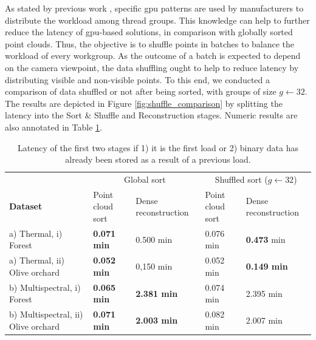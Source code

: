 As stated by previous work \cite{schutz_rendering_2021, kerbl_effective_2017}, specific \acrshort{gpu} patterns are used by manufacturers to distribute the workload among thread groups. This knowledge can help to further reduce the latency of \acrshort{gpu}-based solutions, in comparison with globally sorted point clouds. Thus, the objective is to shuffle points in batches to balance the workload of every workgroup. As the outcome of a batch is expected to depend on the camera viewpoint, the data shuffling ought to help to reduce latency by distributing visible and non-visible points. To this end, we conducted a comparison of data shuffled or not after being sorted, with groups of size $g \gets 32$. The results are depicted in Figure \ref{fig:shuffle_comparison} by splitting the latency into the Sort \& Shuffle and Reconstruction stages. Numeric results are also annotated in Table \ref{table:shuffling_results}.

\renewcommand{\arraystretch}{1.2}
\begin{table}
    \sffamily\footnotesize
    \centering
    \caption{Latency of the first two stages if 1) it is the first load or 2) binary data has already been stored as a result of a previous load. }
    \label{table:shuffling_results}    
    \begin{tabular}{l@{\hskip 0.07in}|ll|ll}
    \toprule
     & \multicolumn{2}{c}{Global sort} & \multicolumn{2}{c}{Shuffled sort ($g \gets 32$)}\\
    \cmidrule{1-5}
    \textbf{Dataset} & Point cloud sort & Dense reconstruction &  Point cloud sort & Dense reconstruction\\
    \cmidrule{1-5}
    a) Thermal, i) Forest & \textbf{0.071 \si{\minute}} & 0.500 \si{\minute}
    & 0.076 \si{\minute} & \textbf{0.473} \si{\minute}\\
    \cmidrule{1-5}
    a) Thermal, ii) Olive orchard & \textbf{0.052 \si{\minute}} & 0,150 \si{\minute}
    & 0.052 \si{\minute} & \textbf{0.149 \si{\minute}}\\
    \cmidrule{1-5}
    b) Multispectral, i) Forest & \textbf{0.065 \si{\minute}} & \textbf{2.381 \si{\minute}}
    & 0.074 \si{\minute} & 2.395 \si{\minute}\\
    \cmidrule{1-5}
    b) Multispectral, ii) Olive orchard & \textbf{0.071 \si{\minute}} & \textbf{2.003 \si{\minute}}
    & 0.082 \si{\minute} & 2.007 \si{\minute}\\
    \bottomrule
    \end{tabular}
\end{table}
\renewcommand{\arraystretch}{1}

